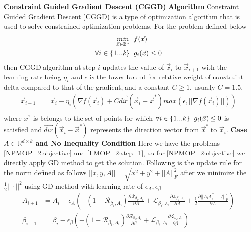 \newline \textbf{Constraint Guided Gradient Descent (CGGD) Algorithm}
\newline Constraint Guided Gradient Descent (CGGD) is a type of optimization algorithm that is used to solve constrained optimization problems. For the problem defined  below 
\begin{equation}
\begin{aligned}
    \underset{\vec{x} \in \mathbb{R}^n}{min} \hspace{2mm} & f(\vec{x})\\
    \forall i \in \{1...k\} \hspace{2mm} & g_i(\vec{x}) \le 0\\
\end{aligned}
\end{equation}
then CGGD algorithm at step $i$ updates the value of $\vec{x}_i$ to $\vec{x}_{i+1}$ with the learning rate being $\eta_i$ and $\epsilon$ is the lower bound for relative weight of constraint delta compared to that of the gradient, and a constant $C\ge 1$, usually $C = 1.5$.
\begin{equation}
\begin{aligned}
    \vec{x}_{i+1} =& \vec{x}_i - \eta_i(\nabla f(\vec{x}_i) + C \vec{dir}(\vec{x}_i-\vec{x}^{*}) max(\epsilon,||\nabla f(\vec{x}_i)||))\\
\end{aligned}
\end{equation}
where $x^{*}$ is belongs to the set of points for which $\forall i \in \{1...k\} \hspace{2mm}  g_i(\vec{x}) \le 0$ is satisfied and $\vec{dir}(\vec{x}_i-\vec{x}^{*})$ represents the direction vector from $\vec{x}^{*}$ to $\vec{x}_i$. 
\newline \newline \textbf{Case $A \in \mathbb{R}^{d \times k}$ and No Inequality Condition}
\newline Here we have the problems \ref{NPMOP_2:objective} and \ref{LMOP_2:step_1}, so for \ref{NPMOP_2:objective} we directly apply GD method to get the solution. Following is the update rule for the norm defined as follows $||x,y,A|| = \sqrt{x^2+y^2+||A||^2_F}$ after we minimize the $\frac{1}{2}||\cdot||^2$ using GD method with learning rate of $\epsilon_A,\epsilon_{\beta}$
\begin{equation}
\begin{aligned}
A_{i+1} &= A_{i} - \epsilon_A ( -(1-\mathcal{R}_{\beta_i, A_i})\frac{\partial \mathcal{R}_{\beta_i, A_i}}{\partial A} + \mathcal{L}_{\beta_i, A_i} \frac{\partial \mathcal{L}_{\beta_i, A_i}}{\partial A}+ \frac{1}{2}\frac{\partial ||A_iA^\top_i -I||^2_F}{\partial A} )\\
\beta_{i+1} &= \beta_{i} - \epsilon_{\beta} ( -(1-\mathcal{R}_{\beta_i, A_i})\frac{\partial \mathcal{R}_{\beta_i, A_i}}{\partial \beta} + \mathcal{L}_{\beta_i, A_i} \frac{\partial \mathcal{L}_{\beta_i, A_i}}{\partial \beta} )\\
\end{aligned}    
\end{equation}
